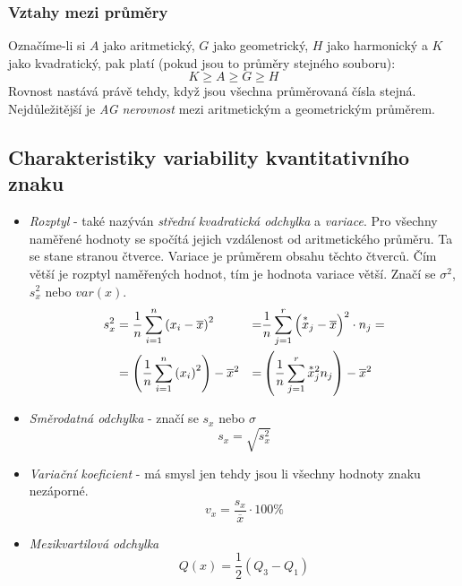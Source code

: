 \documentclass[12pt]{article}
\begin{document}
\subsubsection{Vztahy mezi průměry}
Označíme-li si $A$ jako aritmetický, $G$ jako geometrický, $H$ jako harmonický a $K$ jako kvadratický, pak platí (pokud jsou to průměry stejného souboru):
\begin{equation}
K \geq A \geq G \geq H
\end{equation}
Rovnost nastává právě tehdy, když jsou všechna průměrovaná čísla stejná. Nejdůležitější je \emph{AG nerovnost} mezi aritmetickým a geometrickým průměrem.
\subsection{Charakteristiky variability kvantitativního znaku}
\begin{itemize}
\item \emph{Rozptyl} - také nazýván \emph{střední kvadratická odchylka} a \emph{variace}. Pro všechny naměřené hodnoty se spočítá jejich vzdálenost od aritmetického průměru. Ta se stane stranou čtverce. Variace je průměrem obsahu těchto čtverců. Čím větší je rozptyl naměřených hodnot, tím je hodnota variace větší. Značí se $\sigma^2$, $s_x^2$ nebo $var(x)$.
\begin{align}
\label{eq:rozptyl}
s_x^2 &= \frac{1}{n} \sum^n_{i=1}\left(x_i - \overline{x} \right)^2 &=& \frac{1}{n} \sum^r_{j=1}\left(\overset{*}{x}_j - \overline{x} \right)^2 \cdot n_j=\\
&= \left( \frac{1}{n} \sum^n_{i=1}\left(x_i \right)^2 \right) - \overline{x}^2 &=&  \left( \frac{1}{n} \sum^r_{j=1} \accentset{\scriptstyle *}{x}_j^2 n_j \right) - \overline{x}^2
\end{align}
\item \emph{Směrodatná odchylka} - značí se $s_x$ nebo $\sigma$
\begin{equation}
s_x = \sqrt{s_x^2}
\end{equation}
\item \emph{Variační koeficient} - má smysl jen tehdy jsou li všechny hodnoty znaku nezáporné.	
\begin{equation}
v_x = \frac{s_x}{\overline{x}} \cdot 100\% 
\end{equation}
\item \emph{Mezikvartilová odchylka}
\begin{equation}
Q(x) = \frac{1}{2}\left(Q_3 - Q_1 \right)
\end{equation}
\end{itemize}
\end{document}
